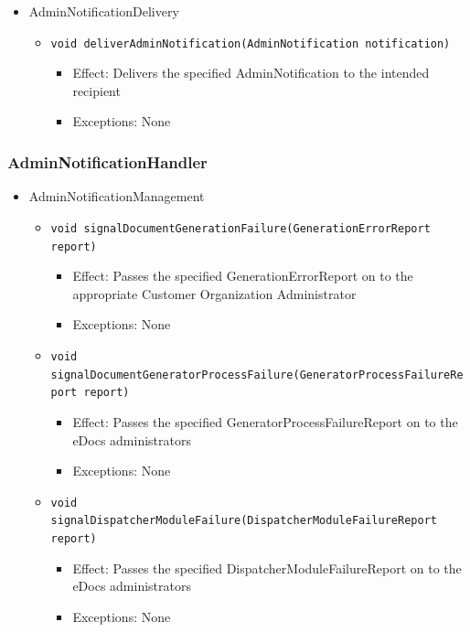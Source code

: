 \documentclass[a4paper,10pt]{article}
\begin{document}
\begin{itemize}
	\item AdminNotificationDelivery
	\begin{itemize}
		\item \texttt{void deliverAdminNotification(AdminNotification notification)}
		\begin{itemize}
			\item Effect: Delivers the specified AdminNotification to the intended recipient
			\item Exceptions: None
		\end{itemize}
	\end{itemize}
\end{itemize}

\subsubsection*{AdminNotificationHandler}
\begin{itemize}
	\item AdminNotificationManagement
	\begin{itemize}
		\item \texttt{void signalDocumentGenerationFailure(GenerationErrorReport report)}
		\begin{itemize}
			\item Effect: Passes the specified GenerationErrorReport on to the appropriate Customer Organization Administrator
			\item Exceptions: None
		\end{itemize}
	\end{itemize}
	
	\begin{itemize}
		\item \texttt{void signalDocumentGeneratorProcessFailure(GeneratorProcessFailureReport report)}
		\begin{itemize}
			\item Effect: Passes the specified GeneratorProcessFailureReport on to the eDocs administrators
			\item Exceptions: None
		\end{itemize}
	\end{itemize}
	
	\begin{itemize}
		\item \texttt{void signalDispatcherModuleFailure(DispatcherModuleFailureReport report)}
		\begin{itemize}
			\item Effect: Passes the specified DispatcherModuleFailureReport on to the eDocs administrators
			\item Exceptions: None
		\end{itemize}
	\end{itemize}
\end{itemize}
\end{document}
